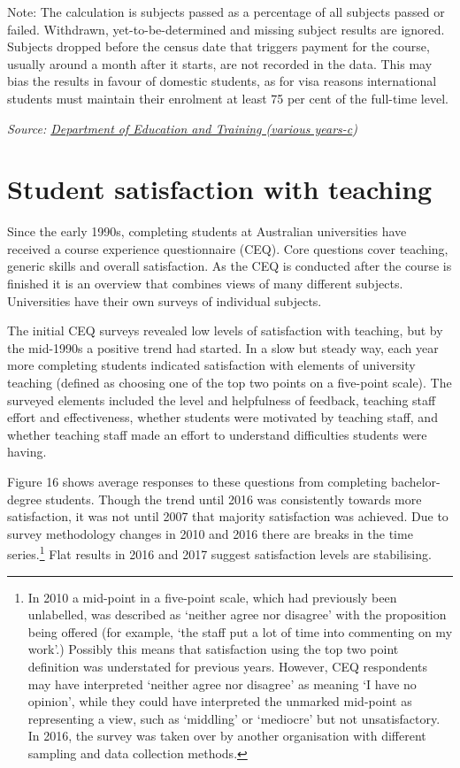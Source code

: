 \documentclass[]{book}
\begin{document}
Note: The calculation is subjects passed as a percentage of all subjects passed or failed. Withdrawn, yet-to-be-determined and missing subject results are ignored. Subjects dropped before the census date that triggers payment for the course, usually around a month after it starts, are not recorded in the data. This may bias the results in favour of domestic students, as for visa reasons international students must maintain their enrolment at least 75 per cent of the full-time level.

\emph{Source: \protect\hyperlink{_ENREF_90}{Department of Education and Training (various years-c})}

\hypertarget{student-satisfaction-with-teaching}{%
\section{Student satisfaction with teaching}\label{student-satisfaction-with-teaching}}

Since the early 1990s, completing students at Australian universities have received a course experience questionnaire (CEQ). Core questions cover teaching, generic skills and overall satisfaction. As the CEQ is conducted after the course is finished it is an overview that combines views of many different subjects. Universities have their own surveys of individual subjects.

The initial CEQ surveys revealed low levels of satisfaction with teaching, but by the mid-1990s a positive trend had started. In a slow but steady way, each year more completing students indicated satisfaction with elements of university teaching (defined as choosing one of the top two points on a five-point scale). The surveyed elements included the level and helpfulness of feedback, teaching staff effort and effectiveness, whether students were motivated by teaching staff, and whether teaching staff made an effort to understand difficulties students were having.

Figure 16 shows average responses to these questions from completing bachelor-degree students. Though the trend until 2016 was consistently towards more satisfaction, it was not until 2007 that majority satisfaction was achieved. Due to survey methodology changes in 2010 and 2016 there are breaks in the time series.\footnote{In 2010 a mid-point in a five-point scale, which had previously been unlabelled, was described as `neither agree nor disagree' with the proposition being offered (for example, `the staff put a lot of time into commenting on my work'.) Possibly this means that satisfaction using the top two point definition was understated for previous years. However, CEQ respondents may have interpreted `neither agree nor disagree' as meaning `I have no opinion', while they could have interpreted the unmarked mid-point as representing a view, such as `middling' or `mediocre' but not unsatisfactory. In 2016, the survey was taken over by another organisation with different sampling and data collection methods.} Flat results in 2016 and 2017 suggest satisfaction levels are stabilising.
\end{document}
